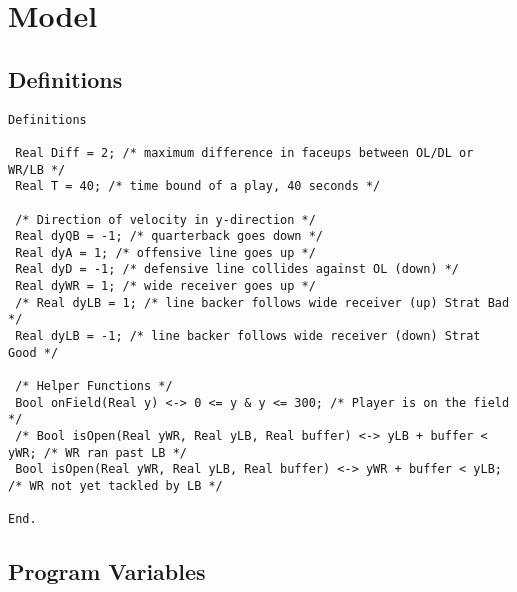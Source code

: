 
\section{Model}

\subsection{Definitions}

\blindtext

\begin{lstlisting}
Definitions

 Real Diff = 2; /* maximum difference in faceups between OL/DL or WR/LB */
 Real T = 40; /* time bound of a play, 40 seconds */

 /* Direction of velocity in y-direction */
 Real dyQB = -1; /* quarterback goes down */
 Real dyA = 1; /* offensive line goes up */
 Real dyD = -1; /* defensive line collides against OL (down) */
 Real dyWR = 1; /* wide receiver goes up */
 /* Real dyLB = 1; /* line backer follows wide receiver (up) Strat Bad */
 Real dyLB = -1; /* line backer follows wide receiver (down) Strat Good */

 /* Helper Functions */
 Bool onField(Real y) <-> 0 <= y & y <= 300; /* Player is on the field */
 /* Bool isOpen(Real yWR, Real yLB, Real buffer) <-> yLB + buffer < yWR; /* WR ran past LB */
 Bool isOpen(Real yWR, Real yLB, Real buffer) <-> yWR + buffer < yLB; /* WR not yet tackled by LB */

End.
\end{lstlisting}

\subsection{Program Variables}

\blindtext

